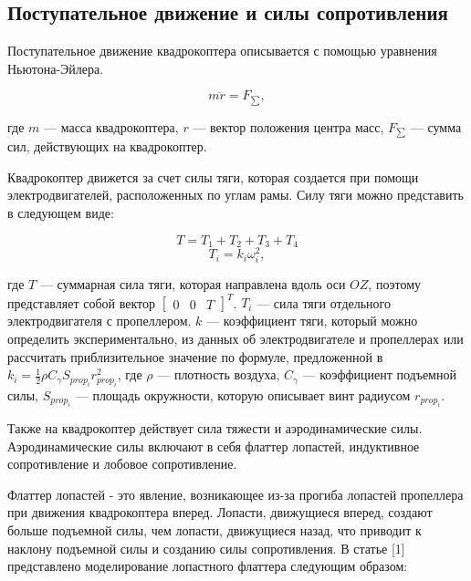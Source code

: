 \subsection{Поступательное движение и силы сопротивления}

Поступательное движение квадрокоптера описывается с помощью уравнения Ньютона-Эйлера. 

\begin{equation} m \ddot{r} = F_{\sum}, \end{equation}

где \(m\) --- масса квадрокоптера, 
\(r\) --- вектор положения центра масс, 
\(F_{\sum}\) --- сумма сил, действующих на квадрокоптер.

Квадрокоптер движется за счет силы тяги, которая создается при помощи электродвигателей, расположенных по углам рамы. Силу тяги можно представить 
в следующем виде:

\begin{equation}
T = T_{1} + T_{2} + T_{3} + T_{4}
\end{equation}
\begin{equation}
T_{i} = k_i \omega_i^2,
\end{equation}

где \(T\) --- суммарная сила тяги, которая направлена вдоль оси \(OZ\), поэтому представляет собой вектор \(\begin{bmatrix}
    0 & 0 & T
\end{bmatrix}^T\). \(T_i\) --- сила тяги отдельного электродвигателя с пропеллером.
\(k\) --- коэффициент тяги, который можно определить экспериментально, из данных об электродвигателе и пропеллерах или 
рассчитать приблизительное значение по формуле, предложенной в \cite{Lysukho}  \(k_i=\frac{1}{2}\rho C_{\gamma} S_{prop_i} r_{prop_i}^2\),
где \(\rho\) --- плотность воздуха, \(C_{\gamma}\) --- коэффициент подъемной силы, \(S_{prop_i}\) --- площадь окружности,
которую описывает винт радиусом \(r_{prop_i}\).


Также на квадрокоптер
действует сила тяжести и аэродинамические силы. Аэродинамические силы включают в себя флаттер лопастей, индуктивное сопротивление 
и лобовое сопротивление. 

Флаттер лопастей - это явление, возникающее из-за прогиба лопастей пропеллера при движения
квадрокоптера вперед. Лопасти, движущиеся вперед, создают больше подъемной силы, чем лопасти,
движущиеся назад, что приводит к наклону подъемной силы и созданию силы сопротивления. В 
статье [1] представлено моделирование лопастного флаттера следующим образом:

